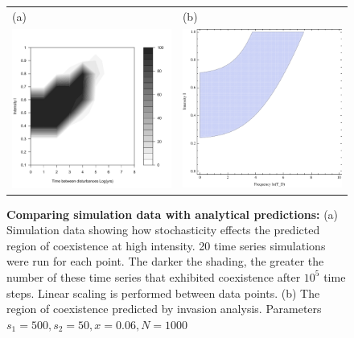\begin{figure}\begin{tabular}{ll}
(a)&(b)\\
 \includegraphics[width=2.5in]{simcoexist.pdf}& \includegraphics[width=2.5in]{hockeyTd.pdf}\end{tabular}
   \caption[Comparing simulation data with analytical predictions]{\textbf{Comparing simulation data with analytical predictions:} (a) Simulation data showing how stochasticity effects the predicted region of coexistence at high intensity. 20 time series simulations were run for each point. The darker the shading, the greater the number of these time series that exhibited coexistence after $10^5$ time steps. Linear scaling is performed between data points. (b) The region of coexistence predicted by invasion analysis. Parameters $s_1=500,s_2=50,x=0.06,N=1000$}
 \label{fig:simulationdata}
\end{figure}

